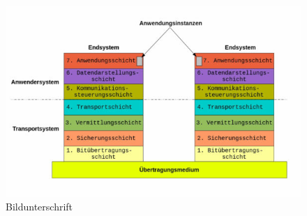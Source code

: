 \documentclass[a4paper, 12pt]{article}
\begin{document}


\begin{figure}
    \centering
    \includegraphics[width=1\linewidth]{OSI.jpg}
    \caption{Bildunterschrift} %
    \label{fig:enter-label} %
\end{figure}
\end{document}
